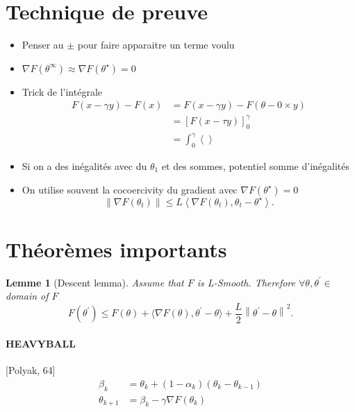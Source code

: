 \documentclass{article}
\theoremstyle{plain}%
\newtheorem{lem}[thm]{Lemme}
\theoremstyle{definition}
\theoremstyle{remark}
\begin{document}
\section{Technique de preuve}
\begin{itemize}
    \item Penser au $ \pm  $ pour faire apparaitre un terme voulu
    \item $ \nabla F(\theta ^\infty ) \approx \nabla F(\theta ^\star ) = 0 $ 
    \item Trick de l'intégrale \begin{align*}
        F(x - \gamma y) - F(x) &= F(x - \gamma y) - F(\theta - 0 \times y) \\
        &= \left[ F(x - \tau y) \right]_0 ^\gamma \\
        &= \int_{0}^{\gamma } \left\langle   \right\rangle 
    \end{align*}
    \item Si on a des inégalités avec du $ \theta _1 $ et des sommes, potentiel somme d'inégalités
    \item On utilise souvent la cocoercivity du gradient avec $ \nabla F(\theta ^\star ) = 0 $ 
    \[
        \left\| \nabla F(\theta _t) \right\| \leq L \left\langle \nabla F(\theta _t), \theta _t - \theta ^\star  \right\rangle 
    .\]
     
\end{itemize}

\section{Théorèmes importants}
\begin{lem}[Descent lemma]
    Assume that $ F $  is L-Smooth. Therefore $ \forall \theta , \theta ^\prime \in  $ domain of $ F $ 
    \[
        F(\theta ^\prime ) \leq  F(\theta ) + \langle \nabla F(\theta ) , \theta ^\prime  - \theta \rangle + \frac{L}{2} \left\| \theta ^\prime  - \theta  \right\| ^2
    .\]
\end{lem}

\paragraph*{HEAVYBALL}[Polyak, 64]
\begin{align*}
    \beta _k &= \theta _k + (1 - \alpha _k) (\theta _k - \theta _{k-1}) \\
    \theta _{k+1} &= \beta _k - \gamma \nabla F(\theta _k)
\end{align*}
\end{document}
